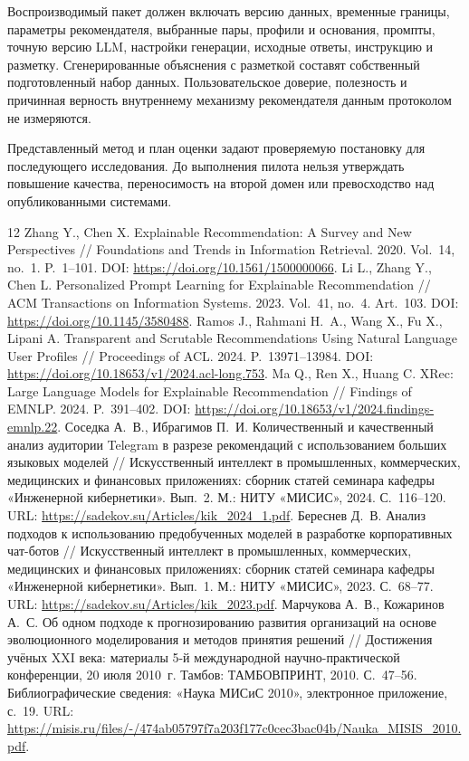 \documentclass{misisarticle}
\begin{document}
Воспроизводимый пакет должен включать версию данных, временные границы, параметры рекомендателя, выбранные пары, профили и основания, промпты, точную версию LLM, настройки генерации, исходные ответы, инструкцию и разметку. Сгенерированные объяснения с разметкой составят собственный подготовленный набор данных. Пользовательское доверие, полезность и причинная верность внутреннему механизму рекомендателя данным протоколом не измеряются.

Представленный метод и план оценки задают проверяемую постановку для последующего исследования. До выполнения пилота нельзя утверждать повышение качества, переносимость на второй домен или превосходство над опубликованными системами.

\clearpage
\balance
\begin{thebibliography}{12}
 Zhang Y., Chen X. Explainable Recommendation: A Survey and New Perspectives // Foundations and Trends in Information Retrieval. 2020. Vol.~14, no.~1. P.~1--101. DOI: \url{https://doi.org/10.1561/1500000066}.
 Li L., Zhang Y., Chen L. Personalized Prompt Learning for Explainable Recommendation // ACM Transactions on Information Systems. 2023. Vol.~41, no.~4. Art.~103. DOI: \url{https://doi.org/10.1145/3580488}.
 Ramos J., Rahmani H.~A., Wang X., Fu X., Lipani A. Transparent and Scrutable Recommendations Using Natural Language User Profiles // Proceedings of ACL. 2024. P.~13971--13984. DOI: \url{https://doi.org/10.18653/v1/2024.acl-long.753}.
 Ma Q., Ren X., Huang C. XRec: Large Language Models for Explainable Recommendation // Findings of EMNLP. 2024. P.~391--402. DOI: \url{https://doi.org/10.18653/v1/2024.findings-emnlp.22}.
 Соседка А.~В., Ибрагимов П.~И. Количественный и качественный анализ аудитории Telegram в разрезе рекомендаций с использованием больших языковых моделей // Искусственный интеллект в промышленных, коммерческих, медицинских и финансовых приложениях: сборник статей семинара кафедры «Инженерной кибернетики». Вып.~2. М.: НИТУ «МИСИС», 2024. С.~116--120. URL: \url{https://sadekov.su/Articles/kik_2024_1.pdf}.
 Береснев Д.~В. Анализ подходов к использованию предобученных моделей в разработке корпоративных чат-ботов // Искусственный интеллект в промышленных, коммерческих, медицинских и финансовых приложениях: сборник статей семинара кафедры «Инженерной кибернетики». Вып.~1. М.: НИТУ «МИСИС», 2023. С.~68--77. URL: \url{https://sadekov.su/Articles/kik_2023.pdf}.
 Марчукова А.~В., Кожаринов А.~С. Об одном подходе к прогнозированию развития организаций на основе эволюционного моделирования и методов принятия решений // Достижения учёных XXI века: материалы 5-й международной научно-практической конференции, 20 июля 2010~г. Тамбов: ТАМБОВПРИНТ, 2010. С.~47--56. Библиографические сведения: «Наука МИСиС 2010», электронное приложение, с.~19. URL: \url{https://misis.ru/files/-/474ab05797f7a203f177c0cec3bac04b/Nauka_MISIS_2010.pdf}.

\end{thebibliography}
\end{document}
